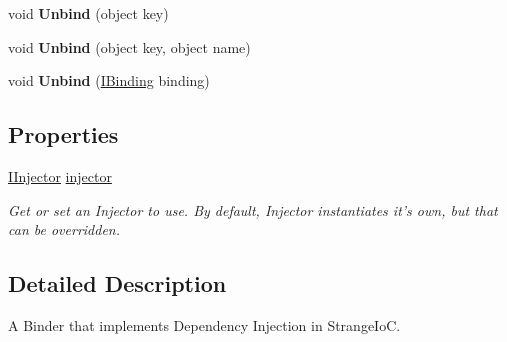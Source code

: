 \begin{DoxyCompactItemize}
\item 
\hypertarget{interfacestrange_1_1extensions_1_1injector_1_1api_1_1_i_injection_binder_a528878415d61df7631451d67995b6802}{void {\bfseries Unbind} (object key)}\label{interfacestrange_1_1extensions_1_1injector_1_1api_1_1_i_injection_binder_a528878415d61df7631451d67995b6802}

\item 
\hypertarget{interfacestrange_1_1extensions_1_1injector_1_1api_1_1_i_injection_binder_a747ae97eefa361ad288bd230613ac2a8}{void {\bfseries Unbind} (object key, object name)}\label{interfacestrange_1_1extensions_1_1injector_1_1api_1_1_i_injection_binder_a747ae97eefa361ad288bd230613ac2a8}

\item 
\hypertarget{interfacestrange_1_1extensions_1_1injector_1_1api_1_1_i_injection_binder_af22c6abf41c878999ea337f0ad093b62}{void {\bfseries Unbind} (\hyperlink{interfacestrange_1_1framework_1_1api_1_1_i_binding}{I\-Binding} binding)}\label{interfacestrange_1_1extensions_1_1injector_1_1api_1_1_i_injection_binder_af22c6abf41c878999ea337f0ad093b62}

\end{DoxyCompactItemize}
\subsection*{Properties}
\begin{DoxyCompactItemize}
\item 
\hypertarget{interfacestrange_1_1extensions_1_1injector_1_1api_1_1_i_injection_binder_a372922eecd2526bfeaa5d802526cef44}{\hyperlink{interfacestrange_1_1extensions_1_1injector_1_1api_1_1_i_injector}{I\-Injector} \hyperlink{interfacestrange_1_1extensions_1_1injector_1_1api_1_1_i_injection_binder_a372922eecd2526bfeaa5d802526cef44}{injector}}\label{interfacestrange_1_1extensions_1_1injector_1_1api_1_1_i_injection_binder_a372922eecd2526bfeaa5d802526cef44}

\begin{DoxyCompactList}\small\item\em Get or set an Injector to use. By default, Injector instantiates it's own, but that can be overridden. \end{DoxyCompactList}\end{DoxyCompactItemize}


\subsection{Detailed Description}
A Binder that implements Dependency Injection in Strange\-Io\-C. 

